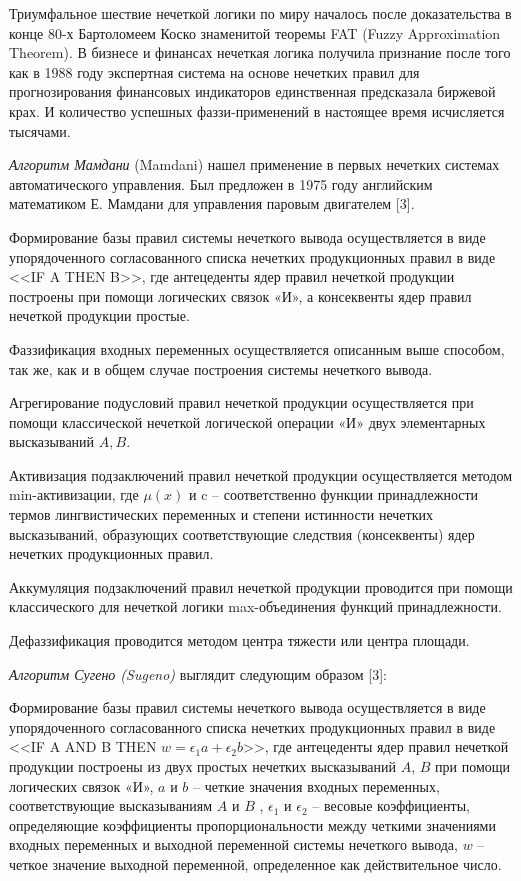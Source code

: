 Триумфальное шествие нечеткой логики по миру началось после доказательства в конце 80-х Бартоломеем Коско знаменитой теоремы FAT (Fuzzy Approximation Theorem).
В бизнесе и финансах нечеткая логика получила признание после того как в 1988 году экспертная система на основе нечетких правил для прогнозирования финансовых
индикаторов единственная предсказала биржевой крах. И количество успешных фаззи-применений в настоящее время исчисляется тысячами.


\textit{Алгоритм Мамдани }(Mamdani) нашел применение в первых нечетких системах автоматического управления. Был предложен в 1975 году английским математиком Е. Мамдани для управления паровым двигателем [3].

Формирование базы правил системы нечеткого вывода осуществляется в виде упорядоченного согласованного списка нечетких продукционных правил в виде <<IF A THEN B>>, где антецеденты ядер правил нечеткой продукции построены при помощи логических связок «И», а консеквенты ядер правил нечеткой продукции простые.

Фаззификация входных переменных осуществляется описанным выше способом, так же, как и в общем случае построения системы нечеткого вывода.

Агрегирование подусловий правил нечеткой продукции осуществляется при помощи классической нечеткой логической операции «И» двух элементарных высказываний $A, B$.

Активизация подзаключений правил нечеткой продукции осуществляется методом min-активизации, где $\mu (x)$ и c – соответственно функции принадлежности термов лингвистических переменных и степени истинности нечетких высказываний, образующих соответствующие следствия (консеквенты) ядер нечетких продукционных правил.

Аккумуляция подзаключений правил нечеткой продукции проводится при помощи классического для нечеткой логики max-объединения функций принадлежности.

Дефаззификация проводится методом центра тяжести или центра площади.

\textit{Алгоритм Сугено (Sugeno)} выглядит следующим образом [3]:

Формирование базы правил системы нечеткого вывода осуществляется в виде упорядоченного согласованного списка нечетких продукционных правил в виде <<IF A AND B THEN $w=\epsilon_1 a + \epsilon_2 b $>>, где антецеденты ядер правил нечеткой продукции построены из двух простых нечетких высказываний $A$, $B$ при помощи логических связок «И», $a$ и $b$ – четкие значения входных переменных, соответствующие высказываниям $A$ и $B$ , $\epsilon_1$ и $\epsilon_2$ – весовые коэффициенты, определяющие коэффициенты пропорциональности между четкими значениями входных переменных и выходной переменной системы нечеткого вывода, $w$ – четкое значение выходной переменной, определенное как действительное число.

